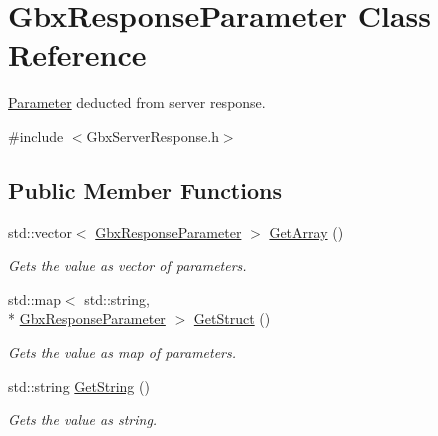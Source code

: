 \hypertarget{classGbxResponseParameter}{\section{Gbx\-Response\-Parameter Class Reference}
\label{classGbxResponseParameter}
}


\hyperlink{structParameter}{Parameter} deducted from server response.  




{\ttfamily \#include $<$Gbx\-Server\-Response.\-h$>$}

\subsection*{Public Member Functions}
\begin{DoxyCompactItemize}
\item 
\hypertarget{classGbxResponseParameter_aa27aca1d5084755fe585401617e2549a}{std\-::vector$<$ \hyperlink{classGbxResponseParameter}{Gbx\-Response\-Parameter} $>$ \hyperlink{classGbxResponseParameter_aa27aca1d5084755fe585401617e2549a}{Get\-Array} ()}\label{classGbxResponseParameter_aa27aca1d5084755fe585401617e2549a}

\begin{DoxyCompactList}\small\item\em Gets the value as vector of parameters. \end{DoxyCompactList}\item 
\hypertarget{classGbxResponseParameter_ab6af5e0662d7d832b7606e9e0f461f22}{std\-::map$<$ std\-::string, \\*
\hyperlink{classGbxResponseParameter}{Gbx\-Response\-Parameter} $>$ \hyperlink{classGbxResponseParameter_ab6af5e0662d7d832b7606e9e0f461f22}{Get\-Struct} ()}\label{classGbxResponseParameter_ab6af5e0662d7d832b7606e9e0f461f22}

\begin{DoxyCompactList}\small\item\em Gets the value as map of parameters. \end{DoxyCompactList}\item 
\hypertarget{classGbxResponseParameter_a014af0f74e937d9002cda3e6e791735b}{std\-::string \hyperlink{classGbxResponseParameter_a014af0f74e937d9002cda3e6e791735b}{Get\-String} ()}\label{classGbxResponseParameter_a014af0f74e937d9002cda3e6e791735b}

\begin{DoxyCompactList}\small\item\em Gets the value as string. \end{DoxyCompactList}\end{DoxyCompactItemize}
